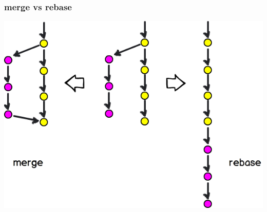 \begin{frame}
	\frametitle{merge vs rebase}
	\includegraphics[width=\textwidth]{images/merge-vs-rebase.png}
\end{frame}
